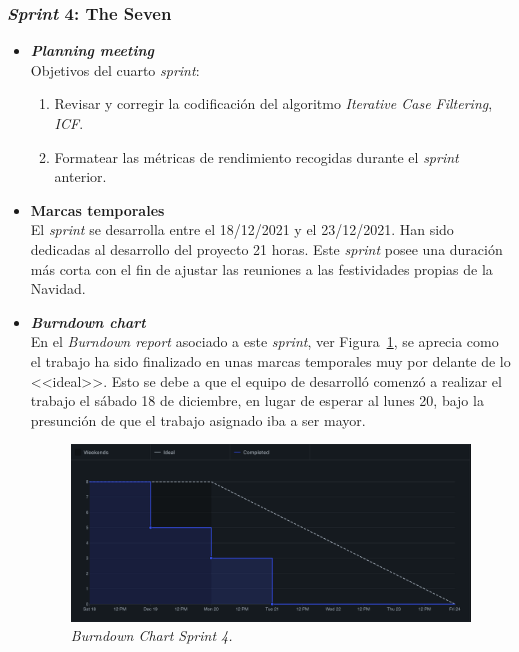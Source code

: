 \subsubsection{\textit{Sprint} 4: The Seven}
\begin{itemize}
\item \textbf{\textit{Planning meeting}}\\
Objetivos del cuarto \textit{sprint}:
\begin{enumerate}
\item Revisar y corregir la codificación del algoritmo \textit{Iterative Case Filtering}, \textit{ICF}.
\item Formatear las métricas de rendimiento recogidas durante el \textit{sprint} anterior.
\end{enumerate}

\item \textbf{Marcas temporales}\\
El \textit{sprint} se desarrolla entre el 18/12/2021 y el 23/12/2021. Han sido dedicadas al desarrollo del proyecto 21 horas. Este \textit{sprint} posee una duración más corta con el fin de ajustar las reuniones a las festividades propias de la Navidad.

\item \textbf{\textit{Burndown chart}}\\
En el \textit{Burndown report} asociado a este \textit{sprint}, ver Figura~\ref{fig:BD-Sprint4}, se aprecia como el trabajo ha sido finalizado  en unas marcas temporales muy por delante de lo <<ideal>>. Esto se debe a que el equipo de desarrolló comenzó a realizar el trabajo el sábado 18 de diciembre, en lugar de esperar al lunes 20, bajo la presunción de que el trabajo asignado iba a ser mayor.
\begin{figure}
\begin{center}
\includegraphics[width=\textwidth]{../img/anexos/sprints/BD-Sprint4}
\caption{\textit{Burndown Chart Sprint 4.}}\label{fig:BD-Sprint4}
\end{center}
\end{figure}


\end{itemize}
